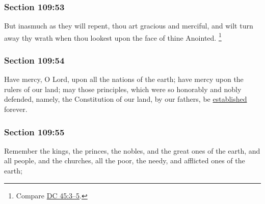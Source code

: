	\subsubsection{Section 109:53} %
		\label{DC109-53}

		But inasmuch as they will repent, thou art gracious and merciful, and wilt turn away thy wrath when thou lookest upon the face of thine Anointed.%
			\footnote{%
				Compare \hyperref[DC45-3]{DC 45:3--5}.
				}


	\subsubsection{Section 109:54} %
		\label{DC109-54}

		Have mercy, O Lord, upon all the nations of the earth; have mercy upon the rulers of our land; may those principles, which were so honorably and nobly defended, namely, the Constitution of our land, by our fathers, be \hyperref[ESTABLISH]{established} forever.


	\subsubsection{Section 109:55} %
		\label{DC109-55}

		Remember the kings, the princes, the nobles, and the great ones of the earth, and all people, and the churches, all the poor, the needy, and afflicted ones of the earth;


